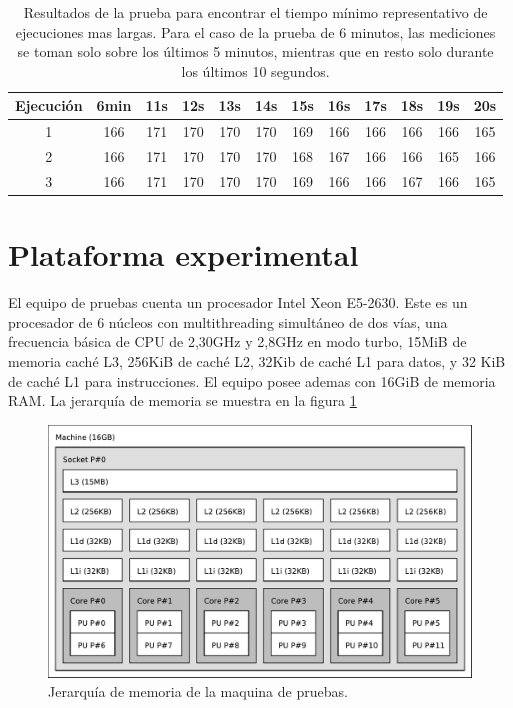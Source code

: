 \begin{table}[h]
	\centering
	\begin{tabular}{c|c|c|c|c|c|c|c|c|c|c|c}

		Ejecución&6min&11s&12s&13s&14s&15s&16s&17s&18s&19s&20s\\

		\hline

		1&166& 171& 170& 170& 170& 169& 166& 166& 166& 166& 165\\

		\hline

		2&166& 171& 170& 170& 170& 168& 167& 166& 166& 165& 166\\

		\hline

		3&166& 171& 170& 170& 170& 169& 166& 166& 167& 166& 165

	\end{tabular}

\caption{Resultados de la prueba para encontrar el tiempo mínimo representativo
	de ejecuciones mas largas. Para el caso de la prueba de 6 minutos, las
	mediciones se toman solo sobre los últimos 5 minutos, mientras que en
	resto solo durante los últimos 10 segundos.}

\label{tabla}

\end{table}

\section{Plataforma experimental}

El equipo de pruebas cuenta un procesador Intel Xeon E5-2630. Este es un
procesador de 6 núcleos con multithreading simultáneo de dos vías, una
frecuencia básica de CPU de 2,30GHz y 2,8GHz en modo turbo, 15MiB de memoria
caché L3, 256KiB de caché L2, 32Kib de caché L1 para datos, y 32 KiB de caché L1
para instrucciones. El equipo posee ademas con 16GiB de memoria RAM. La
jerarquía de memoria se muestra en la figura \ref{topoMemoria}

\begin{figure}[!ht]

	\includegraphics[width=\textwidth]{img/topo.pdf}
	\caption{Jerarquía de memoria de la maquina de pruebas.}

	\label{topoMemoria}

\end{figure}

